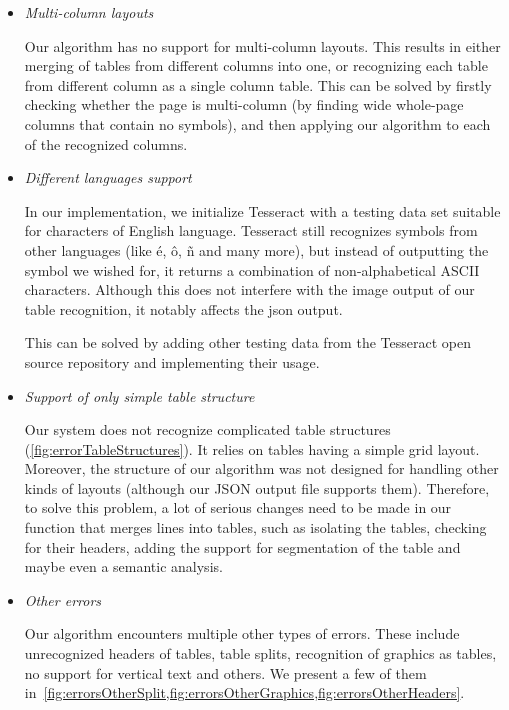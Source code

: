 \begin{itemize}
    \item \emph{Multi-column layouts}
    
    Our algorithm has no support for multi-column layouts. This results in either merging of tables from different columns into one, or recognizing each table from different column as a single column table. This can be solved by firstly checking whether the page is multi-column (by finding wide whole-page columns that contain no symbols), and then applying our algorithm to each of the recognized columns.
    
    \item \emph{Different languages support}
    
    In our implementation, we initialize Tesseract with a testing data set suitable for characters of English language. Tesseract still recognizes symbols from other languages (like é, ô, ñ and many more), but instead of outputting the symbol we wished for, it returns a combination of non-alphabetical ASCII characters. Although this does not interfere with the image output of our table recognition, it notably affects the json output.
    
    This can be solved by adding other testing data from the Tesseract open source repository and implementing their usage.
    
    \item \emph{Support of only simple table structure}
    
    Our system does not recognize complicated table structures (\cref{fig:errorTableStructures}). It relies on tables having a simple grid layout. Moreover, the structure of our algorithm was not designed for handling other kinds of layouts  (although our JSON output file supports them). Therefore, to solve this problem, a lot of serious changes need to be made in our function that merges lines into tables, such as isolating the tables, checking for their headers, adding the support for segmentation of the table and maybe even a semantic analysis.
    
    \item \emph{Other errors}
    
    Our algorithm encounters multiple other types of errors. These include unrecognized headers of tables, table splits, recognition of graphics as tables, no support for vertical text and others. We present a few of them in~\cref{fig:errorsOtherSplit,fig:errorsOtherGraphics,fig:errorsOtherHeaders}.
    
\end{itemize}

